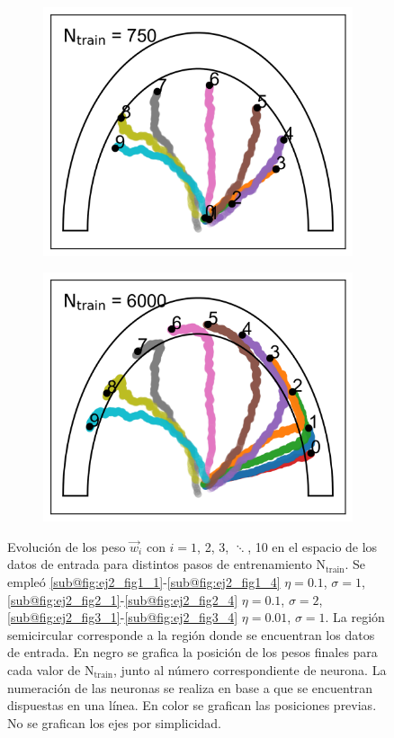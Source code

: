 \documentclass[aps,prb,twocolumn,superscriptaddress,floatfix,longbibliography]{revtex4-2}
\newcounter{para}
\begin{document}
\begin{figure}
\begin{subfigure}[b]{0.24\textwidth}
      \includegraphics[width=\textwidth]{ej2_fig3_3.png}
      \caption{\label{fig:ej2_fig3_3}}
  \end{subfigure}
  \hfill
  \begin{subfigure}[b]{0.24\textwidth}
      \centering
      \includegraphics[width=\textwidth]{ej2_fig3_4.png}
      \caption{\label{fig:ej2_fig3_4}}
  \end{subfigure}
     \caption{Evolución de los peso $\vec{w}_i$ con $i = 1$, 2, 3, $\ddots$, 10 en el espacio de los datos de entrada para distintos pasos de entrenamiento $\mathrm{N_{train}}$. Se empleó \ref{sub@fig:ej2_fig1_1}-\ref{sub@fig:ej2_fig1_4} $\eta = 0.1$, $\sigma = 1$, \ref{sub@fig:ej2_fig2_1}-\ref{sub@fig:ej2_fig2_4} $\eta = 0.1$, $\sigma = 2$, \ref{sub@fig:ej2_fig3_1}-\ref{sub@fig:ej2_fig3_4} $\eta = 0.01$, $\sigma = 1$. La región semicircular corresponde a la región donde se encuentran los datos de entrada. En negro se grafica la posición de los pesos finales para cada valor de $\mathrm{N_{train}}$, junto al número correspondiente de neurona. La numeración de las neuronas se realiza en base a que se encuentran dispuestas en una línea. En color se grafican las posiciones previas. No se grafican los ejes por simplicidad.}

\end{figure}
\end{document}
